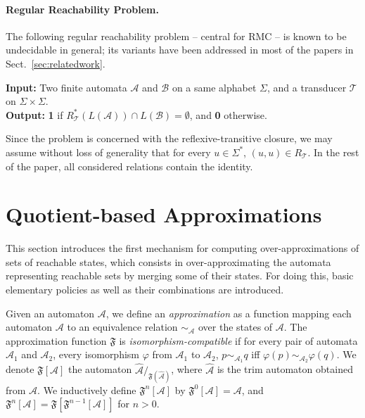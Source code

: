 \documentclass[]{llncs}
\def \A {\mathcal{A}}
\def \T {\mathcal{T}}
\def \B {\mathcal{B}}
\begin{document}
\paragraph*{Regular Reachability Problem.}
The following regular reachability problem -- central for RMC -- is known to be undecidable in general; its variants have
been addressed in most of the papers in Sect.~\ref{sec:relatedwork}. \smallskip

\noindent
{\bf Input:} Two finite automata $\A$ and $\mathcal{B}$ on a same alphabet $\Sigma$, 
and a transducer $\T$ on $\Sigma\times\Sigma$.\\
{\bf Output:} {\bf 1} if $R_\T^*(L(\A))\cap L(\B)=\emptyset$, and {\bf 0}
otherwise. 
\smallskip

 


Since the problem is concerned with the reflexive-transitive closure, we may
assume without loss of generality that for every $u\in \Sigma^*$,
$(u,u)\in R_\T$. In the rest of the paper, all considered relations contain the
identity.




\section{Quotient-based Approximations}
\label{quotient-based-approximations}

This section introduces the first mechanism for computing
over-approximations of sets of reachable states, which consists in
over-approximating the automata representing reachable sets by merging
some of their states. For doing this, basic elementary policies as
well as their combinations are introduced.
  
Given an automaton $\A$, we define an {\it approximation} as a
function mapping each automaton $\A$ to an equivalence relation
$\sim_\A$ over the states of $\A$. The approximation function
$\mathfrak{F}$ is {\it isomorphism-compatible} if for every pair of
automata $\A_1$ and $\A_2$, every isomorphism $\varphi$ from $\A_1$ to $\A_2$,
$p\sim_{\A_1} q$ iff $\varphi(p)\sim_{\A_2} \varphi(q)$. We denote
$\mathfrak{F}[\A]$ the automaton $\hat{\A}/_{\mathfrak{F}(\hat{\A})}$,
where $\hat{\A}$ is the trim automaton obtained from $\A$. We
inductively define $\mathfrak{F}^n[\A]$ by $\mathfrak{F}^0[\A]=\A$, and
$\mathfrak{F}^{n}[\A]=\mathfrak{F}[\mathfrak{F}^{n-1}[\A]]$ for $n>0$.
\end{document}
